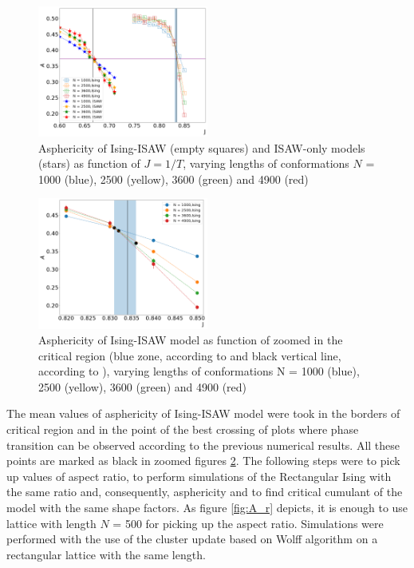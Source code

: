 \begin{figure}[h!]
        \includegraphics[width=0.5\textwidth]{Images/Ising_ISAW_A_J_Full.png}
        \caption{Asphericity of Ising-ISAW (empty squares) and ISAW-only models (stars) as function of $J=1/T$, varying lengths of conformations $N$ = 1000 (blue), 2500 (yellow), 3600 (green) and 4900 (red)}
        \label{fig:Ising&ISAW_A_J}
\end{figure}
\begin{figure}[h!]
        \includegraphics[width=0.5\textwidth]{Images/Ising_A_J_Close.png}
        \caption{Asphericity of Ising-ISAW model as function of zoomed in the critical region (blue zone, according to \cite{Foster2021} and black vertical line, according to \cite{faizullina2021critical}), varying lengths of conformations N = 1000 (blue), 2500 (yellow), 3600 (green) and 4900 (red)}
        \label{fig:Ising_A_J}
\end{figure}


The mean values of asphericity of Ising-ISAW model were took in the borders of critical region and in the point of the best crossing of plots where phase transition can be observed according to the previous numerical results. 
All these points are marked as black in zoomed figures \ref{fig:Ising_A_J}. 
The following steps were to pick up values of aspect ratio, to perform simulations of the Rectangular Ising with the same ratio and, consequently, asphericity and to find critical cumulant of the model with the same shape factors. 
As figure \ref{fig:A_r} depicts, it is enough to use lattice with length $N$ = 500 for picking up the aspect ratio. 
Simulations were performed with the use of the cluster update based on Wolff algorithm \cite{Newmanb1999} on a rectangular lattice with the same length.\\

